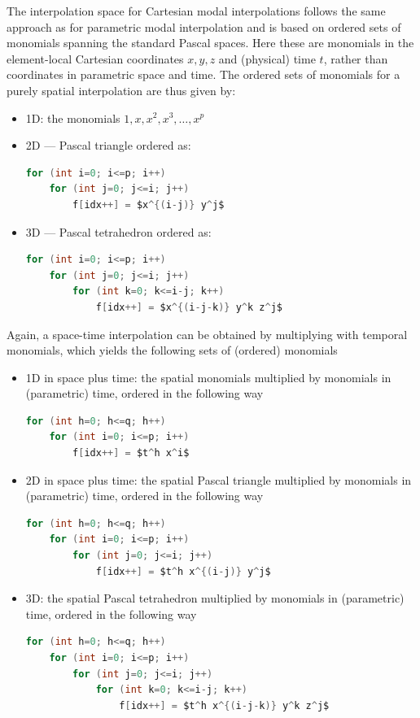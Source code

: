 \documentclass[11pt,letterpaper]{article}
\newenvironment{v2quote}
  {\begin{v2quoteframe}%
   \noindent{\footnotesize\sffamily\bfseries\color{cgnsblue}v2 text}%
   \nopagebreak\par\nopagebreak\vspace{0.15em}}
  {\end{v2quoteframe}}
\begin{document}
\begin{v2quote}
The interpolation space for Cartesian modal interpolations follows the same approach as for
parametric modal interpolation and is based on ordered sets of monomials spanning the standard
Pascal spaces.  Here these are monomials in the element-local Cartesian coordinates $x, y, z$
and (physical) time $t$, rather than coordinates in parametric space and time.  The ordered sets
of monomials for a purely spatial interpolation are thus given by:

\begin{itemize}
  \item 1D: the monomials $1, x, x^2, x^3, \ldots, x^p$
  \item 2D --- Pascal triangle ordered as:
\begin{lstlisting}[language=C,numbers=none]
for (int i=0; i<=p; i++)
    for (int j=0; j<=i; j++)
        f[idx++] = $x^{(i-j)} y^j$
\end{lstlisting}
  \item 3D --- Pascal tetrahedron ordered as:
\begin{lstlisting}[language=C,numbers=none]
for (int i=0; i<=p; i++)
    for (int j=0; j<=i; j++)
        for (int k=0; k<=i-j; k++)
            f[idx++] = $x^{(i-j-k)} y^k z^j$
\end{lstlisting}
\end{itemize}
Again, a space-time interpolation can be obtained by multiplying with temporal monomials,
which yields the following sets of (ordered) monomials
\begin{itemize}
  \item 1D in space plus time: the spatial monomials multiplied by monomials in (parametric)
    time, ordered in the following way
\begin{lstlisting}[language=C,numbers=none]
for (int h=0; h<=q; h++)
    for (int i=0; i<=p; i++)
        f[idx++] = $t^h x^i$
\end{lstlisting}
  \item 2D in space plus time: the spatial Pascal triangle multiplied by monomials in
    (parametric) time, ordered in the following way
\begin{lstlisting}[language=C,numbers=none]
for (int h=0; h<=q; h++)
    for (int i=0; i<=p; i++)
        for (int j=0; j<=i; j++)
            f[idx++] = $t^h x^{(i-j)} y^j$
\end{lstlisting}
  \item 3D: the spatial Pascal tetrahedron multiplied by monomials in (parametric) time,
    ordered in the following way
\begin{lstlisting}[language=C,numbers=none]
for (int h=0; h<=q; h++)
    for (int i=0; i<=p; i++)
        for (int j=0; j<=i; j++)
            for (int k=0; k<=i-j; k++)
                f[idx++] = $t^h x^{(i-j-k)} y^k z^j$
\end{lstlisting}
\end{itemize}
\end{v2quote}
\end{document}

